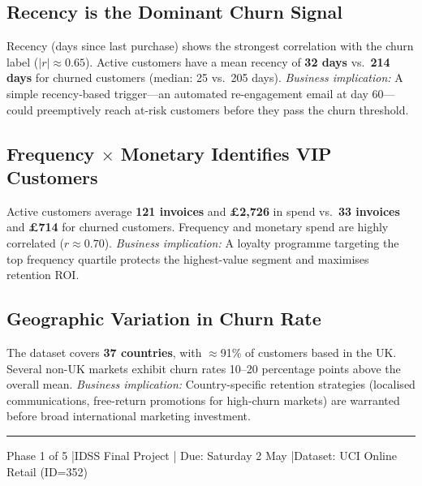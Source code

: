 \documentclass[12pt, a4paper]{article}
\begin{document}
\subsection{Recency is the Dominant Churn Signal}

Recency (days since last purchase) shows the strongest correlation with the churn label
($|r| \approx 0.65$). Active customers have a mean recency of \textbf{32 days} vs.\
\textbf{214 days} for churned customers (median: 25 vs.\ 205 days).
\textit{Business implication:} A simple recency-based trigger---an automated re-engagement
email at day 60---could preemptively reach at-risk customers before they pass the churn
threshold.

\subsection{Frequency $\times$ Monetary Identifies VIP Customers}

Active customers average \textbf{121 invoices} and \textbf{\pounds 2,726} in spend vs.\
\textbf{33 invoices} and \textbf{\pounds 714} for churned customers. Frequency and monetary
spend are highly correlated ($r \approx 0.70$). \textit{Business implication:} A loyalty
programme targeting the top frequency quartile protects the highest-value segment and
maximises retention ROI.

\subsection{Geographic Variation in Churn Rate}

The dataset covers \textbf{37 countries}, with $\approx$91\% of customers based in the UK.
Several non-UK markets exhibit churn rates 10--20 percentage points above the overall mean.
\textit{Business implication:} Country-specific retention strategies (localised
communications, free-return promotions for high-churn markets) are warranted before broad
international marketing investment.

\vspace{\fill}
\textcolor{tableborder}{\rule{\linewidth}{0.4pt}}
{\small\color{midgray}
Phase 1 of 5 \quad|\quad IDSS Final Project \quad|\quad
Due: Saturday 2 May \quad|\quad Dataset: UCI Online Retail (ID=352)}
\end{document}
